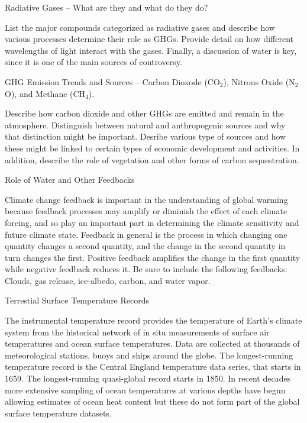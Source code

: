 \documentclass{article}\usepackage[]{graphicx}\usepackage[]{color}
\newenvironment{enumerate*}%
  {\begin{enumerate}%
    \setlength{\itemsep}{0pt}%
    \setlength{\parskip}{0pt}}%
  {\end{enumerate}}
\begin{document}
\begin{enumerate*}
  \item Radiative Gases -- What are they and what do they do?
  
List the major compounds categorized as radiative gases and describe how various processes determine their role as GHGs. Provide detail on how different wavelengths of light interact with the gases. Finally, a discussion of water is key, since it is one of the main sources of controversy. 
  
  \item GHG Emission Trends and Sources -- Carbon Dioxode (CO$_2$), Nitrous Oxide (N$_2$O), and Methane (CH$_4$).

Describe how carbon dioxide and other GHGs are emitted and remain in the atmosphere. Distinguish between natural and anthropogenic sources and why that distinction might be important. Desribe various type of sources and how these might be linked to certain types of economic development and activities. In addition, describe the role of vegetation and other forms of carbon sequestration.

  \item Role of Water and Other Feedbacks
  
Climate change feedback is important in the understanding of global warming because feedback processes may amplify or diminish the effect of each climate forcing, and so play an important part in determining the climate sensitivity and future climate state. Feedback in general is the process in which changing one quantity changes a second quantity, and the change in the second quantity in turn changes the first. Positive feedback amplifies the change in the first quantity while negative feedback reduces it. Be sure to include the following feedbacks: Clouds, gas release, ice-albedo, carbon, and water vapor.

  \item Terrestial Surface Temperature Records
  
The instrumental temperature record provides the temperature of Earth's climate system from the historical network of in situ measurements of surface air temperatures and ocean surface temperatures. Data are collected at thousands of meteorological stations, buoys and ships around the globe. The longest-running temperature record is the Central England temperature data series, that starts in 1659. The longest-running quasi-global record starts in 1850. In recent decades more extensive sampling of ocean temperatures at various depths have begun allowing estimates of ocean heat content but these do not form part of the global surface temperature datasets.
  

\end{enumerate*}
\end{document}
